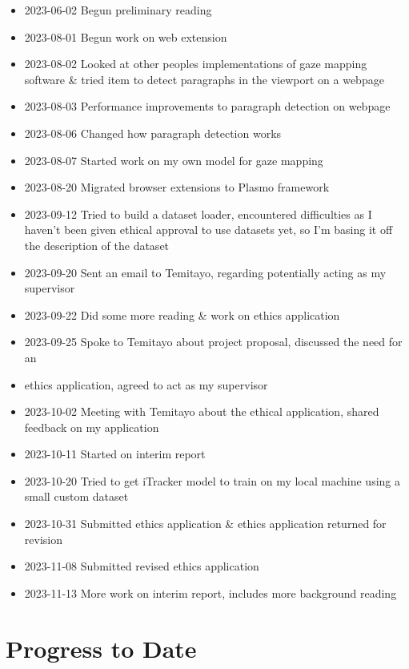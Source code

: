 \documentclass[twocolumn]{report}
\begin{document}
\begin{itemize}
    \item 2023-06-02 Begun preliminary reading 
    \item 2023-08-01 Begun work on web extension 
    \item 2023-08-02 Looked at other peoples implementations of gaze mapping software \& tried item to detect paragraphs in the viewport on a webpage 
    \item 2023-08-03 Performance improvements to paragraph detection on webpage 
    \item 2023-08-06 Changed how paragraph detection works 
    \item 2023-08-07 Started work on my own model for gaze mapping 
    \item 2023-08-20 Migrated browser extensions to Plasmo framework 
    \item 2023-09-12 Tried to build a dataset loader, encountered difficulties as I haven't been given ethical approval to use datasets yet, so I'm basing it off the description of the dataset
    \item 2023-09-20 Sent an email to Temitayo, regarding potentially acting as my supervisor
    \item 2023-09-22 Did some more reading \& work on ethics application  
    \item 2023-09-25 Spoke to Temitayo about project proposal, discussed the need for an
    \item ethics application, agreed to act as my supervisor 
    \item 2023-10-02 Meeting with Temitayo about the ethical application, shared feedback on my application 
    \item 2023-10-11 Started on interim report 
    \item 2023-10-20 Tried to get iTracker model to train on my local machine using a small custom dataset 
    \item 2023-10-31 Submitted ethics application \& ethics application returned for revision
    \item 2023-11-08 Submitted revised ethics application 
    \item 2023-11-13 More work on interim report, includes more background reading
\end{itemize}

\section{Progress to Date}
\end{document}
